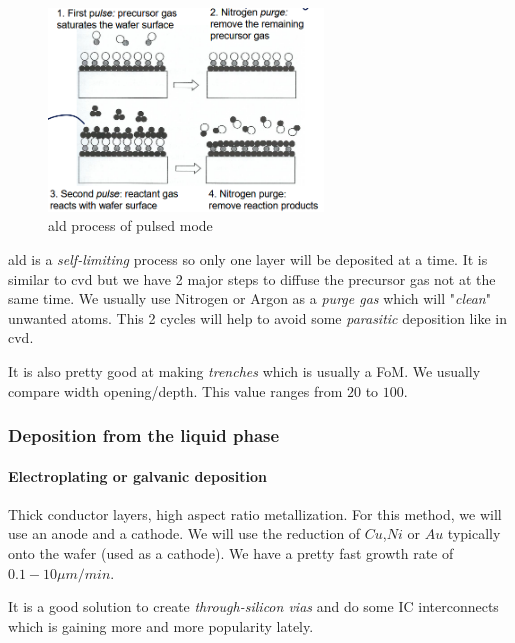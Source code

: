 \documentclass[
]{article}
\begin{document}
\begin{figure}
\hypertarget{fig:ALD-pulsed-mode-label}{%
\centering
\includegraphics[width=0.65\textwidth,height=\textheight]{ALD_cycle.png}
\caption{{ald} process of pulsed mode}\label{fig:ALD-pulsed-mode-label}
}
\end{figure}

{ald} is a \emph{self-limiting} process so only one layer will be
deposited at a time. It is similar to {cvd} but we have 2 major steps to
diffuse the precursor gas not at the same time. We usually use Nitrogen
or Argon as a \emph{purge gas} which will "\emph{clean}" unwanted atoms.
This 2 cycles will help to avoid some \emph{parasitic} deposition like
in {cvd}.

It is also pretty good at making \emph{trenches} which is usually a FoM.
We usually compare width opening/depth. This value ranges from \(20\) to
\(100\).

\hypertarget{deposition-from-the-liquid-phase}{%
\subsubsection{Deposition from the liquid
phase}\label{deposition-from-the-liquid-phase}}

\hypertarget{electroplating-or-galvanic-deposition}{%
\paragraph{Electroplating or galvanic
deposition}\label{electroplating-or-galvanic-deposition}}

Thick conductor layers, high aspect ratio metallization. For this
method, we will use an anode and a cathode. We will use the reduction of
\(Cu\),\(Ni\) or \(Au\) typically onto the wafer (used as a cathode). We
have a pretty fast growth rate of \(0.1-10 \mu m/min\).

It is a good solution to create \emph{through-silicon vias} and do some
IC interconnects which is gaining more and more popularity lately.
\end{document}
